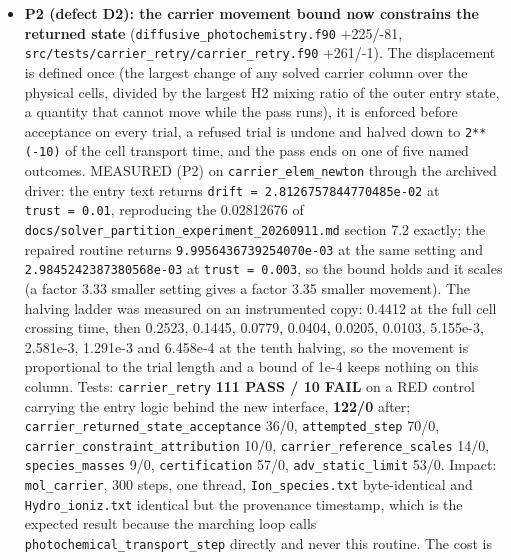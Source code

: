 \documentclass[english,a4paper]{my_memo}
\begin{document}
\begin{itemize}
  (\texttt{the\_relaxation\_fixed\_point\_under\_a\_callers\_ghost} built a column whose
  species missed rho by \texttt{1.321E-01}): on the suite\textquotesingle s own mass-closed column
  the worst interior element row of the relaxation fixed point moves from
  \texttt{1.62384E-02} to \texttt{1.35062E-13}, so the fixed point on a mass-closed column
  really is a zero of the stationary element row.
\item
  \textbf{P2 (defect D2): the carrier movement bound now constrains the returned
  state} (\texttt{diffusive\_photochemistry.f90} +225/-81,
  \texttt{src/tests/carrier\_retry/carrier\_retry.f90} +261/-1). The displacement is defined once (the largest change of any solved
  carrier column over the physical cells, divided by the largest H2 mixing
  ratio of the outer entry state, a quantity that cannot move while the pass
  runs), it is enforced before acceptance on every trial, a refused trial is
  undone and halved down to \texttt{2**(-10)} of the cell transport time, and the
  pass ends on one of five named outcomes. MEASURED (P2) on
  \texttt{carrier\_elem\_newton} through the archived driver: the entry text returns
  \texttt{drift\ =\ 2.8126757844770485e-02} at \texttt{trust\ =\ 0.01}, reproducing the
  0.02812676 of \texttt{docs/solver\_partition\_experiment\_20260911.md} section 7.2
  exactly; the repaired routine returns \texttt{9.9956436739254070e-03} at the same
  setting and \texttt{2.9845242387380568e-03} at \texttt{trust\ =\ 0.003}, so the bound holds
  and it scales (a factor 3.33 smaller setting gives a factor 3.35 smaller
  movement). The halving ladder was measured on an instrumented copy: 0.4412
  at the full cell crossing time, then 0.2523, 0.1445, 0.0779, 0.0404,
  0.0205, 0.0103, 5.155e-3, 2.581e-3, 1.291e-3 and 6.458e-4 at the tenth
  halving, so the movement is proportional to the trial length and a bound of
  1e-4 keeps nothing on this column. Tests: \texttt{carrier\_retry} \textbf{111 PASS / 10
  FAIL} on a RED control carrying the entry logic behind the new interface,
  \textbf{122/0} after; \texttt{carrier\_returned\_state\_acceptance} 36/0, \texttt{attempted\_step}
  70/0, \texttt{carrier\_constraint\_attribution} 10/0, \texttt{carrier\_reference\_scales}
  14/0, \texttt{species\_masses} 9/0, \texttt{certification} 57/0, \texttt{adv\_static\_limit} 53/0.
  Impact: \texttt{mol\_carrier}, 300 steps, one thread, \texttt{Ion\_species.txt}
  byte-identical and \texttt{Hydro\_ioniz.txt} identical but the provenance
  timestamp, which is the expected result because the marching loop calls
  \texttt{photochemical\_transport\_step} directly and never this routine. The cost is

\end{itemize}
\end{document}
